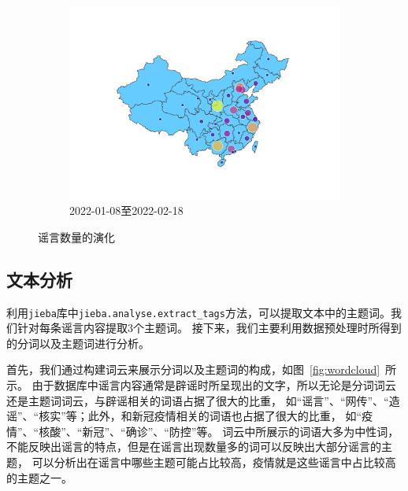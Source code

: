 \documentclass[UTF8]{ctexart}
\begin{document}
\begin{figure}[!ht]
\begin{subfigure}[b]{0.3\textwidth}
         \centering
         \includegraphics[width=\textwidth]{../figures/rumor_num_choropleth_2}
         \caption{2022-01-08至2022-02-18}
         \label{subfig:rumor_num_choropleth_2}
     \end{subfigure}
    \caption{谣言数量的演化}
    \label{fig:rumor_num_evolution}
\end{figure}

\subsection{文本分析}

利用\verb|jieba|库中\verb|jieba.analyse.extract_tags|方法，可以提取文本中的主题词。我们针对每条谣言内容提取3个主题词。
接下来，我们主要利用数据预处理时所得到的分词以及主题词进行分析。

首先，我们通过构建词云来展示分词以及主题词的构成，如图~\ref{fig:wordcloud}~所示。
由于数据库中谣言内容通常是辟谣时所呈现出的文字，所以无论是分词词云还是主题词词云，与辟谣相关的词语占据了很大的比重，
如“谣言”、“网传”、“造谣”、“核实”等；此外，和新冠疫情相关的词语也占据了很大的比重，
如“疫情”、“核酸”、“新冠”、“确诊”、“防控”等。
词云中所展示的词语大多为中性词，不能反映出谣言的特点，但是在谣言出现数量多的词可以反映出大部分谣言的主题，
可以分析出在谣言中哪些主题可能占比较高，疫情就是这些谣言中占比较高的主题之一。
\end{document}
